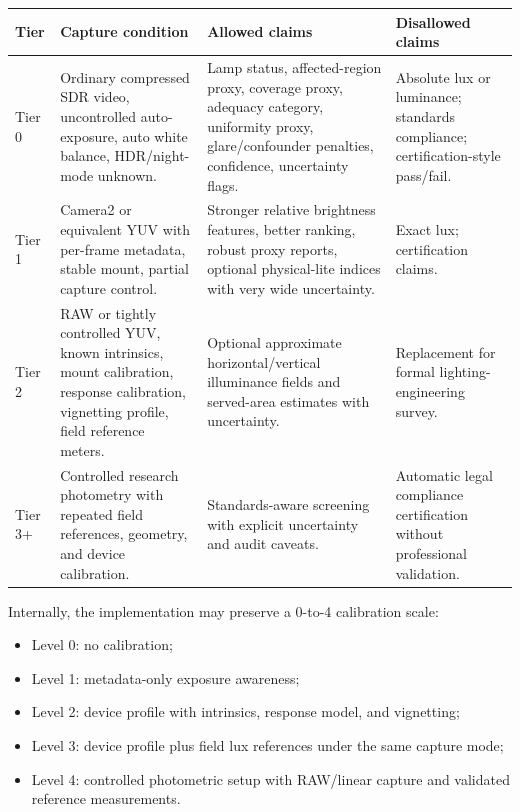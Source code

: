 \documentclass[11pt]{article}
\begin{document}
\begin{center}
\small
\begin{tabular}{p{}p{}p{}p{}}
\toprule
\textbf{Tier} & \textbf{Capture condition} & \textbf{Allowed claims} & \textbf{Disallowed claims} \\
\midrule
Tier 0 & Ordinary compressed SDR video, uncontrolled auto-exposure, auto white balance, HDR/night-mode unknown. & Lamp status, affected-region proxy, coverage proxy, adequacy category, uniformity proxy, glare/confounder penalties, confidence, uncertainty flags. & Absolute lux or luminance; standards compliance; certification-style pass/fail. \\
Tier 1 & Camera2 or equivalent YUV with per-frame metadata, stable mount, partial capture control. & Stronger relative brightness features, better ranking, robust proxy reports, optional physical-lite indices with very wide uncertainty. & Exact lux; certification claims. \\
Tier 2 & RAW or tightly controlled YUV, known intrinsics, mount calibration, response calibration, vignetting profile, field reference meters. & Optional approximate horizontal/vertical illuminance fields and served-area estimates with uncertainty. & Replacement for formal lighting-engineering survey. \\
Tier 3+ & Controlled research photometry with repeated field references, geometry, and device calibration. & Standards-aware screening with explicit uncertainty and audit caveats. & Automatic legal compliance certification without professional validation. \\
\bottomrule
\end{tabular}
\end{center}

Internally, the implementation may preserve a 0-to-4 calibration scale:
\begin{itemize}
  \item Level 0: no calibration;
  \item Level 1: metadata-only exposure awareness;
  \item Level 2: device profile with intrinsics, response model, and vignetting;
  \item Level 3: device profile plus field lux references under the same capture mode;
  \item Level 4: controlled photometric setup with RAW/linear capture and validated reference measurements.
\end{itemize}
\end{document}
